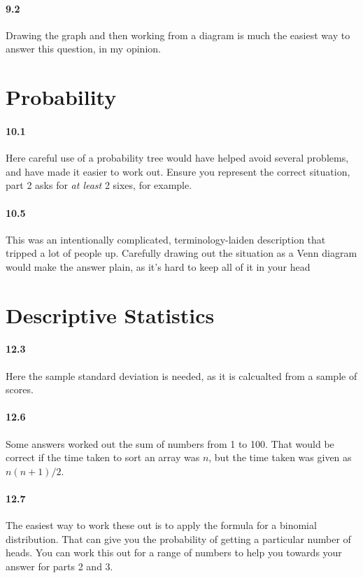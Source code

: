 \documentclass{article}
\begin{document}
\paragraph{9.2} Drawing the graph and then working from a diagram is much the easiest way to answer this question, in my opinion.

\section{Probability}

\paragraph{10.1} Here careful use of a probability tree would have helped avoid several problems, and have made it easier to work out. Ensure you represent the correct situation, part 2 asks for \emph{at least} 2 sixes, for example.

\paragraph{10.5} This was an intentionally complicated, terminology-laiden description that tripped a lot of people up. Carefully drawing out the situation as a Venn diagram would make the answer plain, as it's hard to keep all of it in your head

\section{Descriptive Statistics}

\paragraph{12.3} Here the sample standard deviation is needed, as it is calcualted from a sample of scores.

\paragraph{12.6} Some answers worked out the sum of numbers from 1 to 100. That would be correct if the time taken to sort an array was $n$, but the time taken was given as $n(n+1)/2$. 

\paragraph{12.7} The easiest way to work these out is to apply the formula for a binomial distribution. That can give you the probability of getting a particular number of heads. You can work this out for a range of numbers to help you towards your answer for parts 2 and 3.
\end{document}
